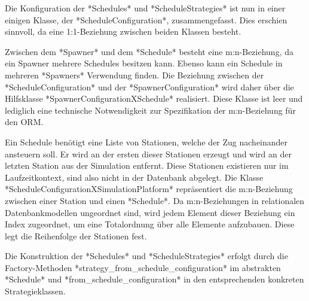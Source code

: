 Die Konfiguration der *Schedules* und *ScheduleStrategies* ist nun in einer einigen Klasse, der *ScheduleConfiguration*, zusammengefasst. Dies erschien sinnvoll, da eine 1:1-Beziehung zwischen beiden Klassen besteht.

Zwischen dem *Spawner* und dem *Schedule* besteht eine m:n-Beziehung, da ein Spawner mehrere Schedules besitzen kann. Ebenso kann ein Schedule in mehreren *Spawners* Verwendung finden. Die Beziehung zwischen der *ScheduleConfiguration* und der *SpawnerConfiguration* wird daher über die Hilfsklasse *SpawnerConfigurationXSchedule* realisiert. Diese Klasse ist leer und lediglich eine technische Notwendigkeit zur Spezifikation der m:n-Beziehung für den ORM.

Ein Schedule benötigt eine Liste von Stationen, welche der Zug nacheinander ansteuern soll. Er wird an der ersten dieser Stationen erzeugt und wird an der letzten Station aus der Simulation entfernt. Diese Stationen existieren nur im Laufzeitkontext, sind also nicht in der Datenbank abgelegt. Die Klasse *ScheduleConfigurationXSimulationPlatform* repräsentiert die m:n-Beziehung zwischen einer Station und einen *Schedule*. Da m:n-Beziehungen in relationalen Datenbankmodellen ungeordnet sind, wird jedem Element dieser Beziehung ein Index zugeordnet, um eine Totalordnung über alle Elemente aufzubauen. Diese legt die Reihenfolge der Stationen fest.

Die Konstruktion der *Schedules* und *ScheduleStrategies* erfolgt durch die Factory-Methoden *strategy\_from\_schedule\_configuration* im abstrakten *Schedule* und *from\_schedule\_configuration* in den entsprechenden konkreten Strategieklassen.
